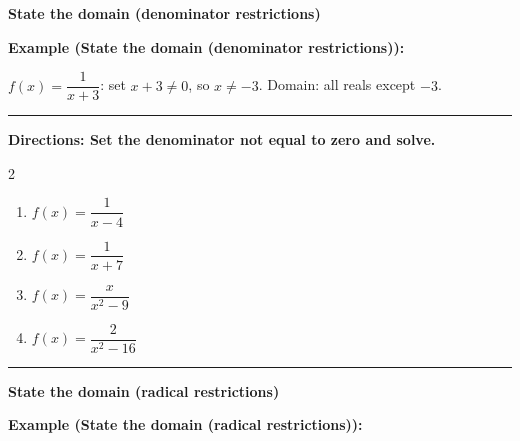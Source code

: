 \documentclass[12pt]{article}
\begin{document}
\vspace{0.35cm}

\begin{center}{\Large \textbf{State the domain (denominator restrictions)}}\end{center}\vspace{0.2cm}
\textbf{Example (State the domain (denominator restrictions)):}

$f(x)=\dfrac{1}{x+3}$: set $x+3\ne 0$, so $x\ne -3$. Domain: all reals except $-3$.

\vspace{0.2cm}\hrule\vspace{0.35cm}
\textbf{Directions: Set the denominator not equal to zero and solve.}

\begin{multicols}{2}
\begin{enumerate}[label=\textbf{\arabic*.}, start=1, itemsep=1.3cm]
  \item $\displaystyle f(x)=\dfrac{1}{x-4}$
  \item $\displaystyle f(x)=\dfrac{1}{x+7}$
  \item $\displaystyle f(x)=\dfrac{x}{x^{2}-9}$
  \item $\displaystyle f(x)=\dfrac{2}{x^{2}-16}$
\end{enumerate}
\end{multicols}
\vspace{0.25cm}\hrule\vspace{0.35cm}

\begin{center}{\Large \textbf{State the domain (radical restrictions)}}\end{center}\vspace{0.2cm}
\textbf{Example (State the domain (radical restrictions)):}
\end{document}
